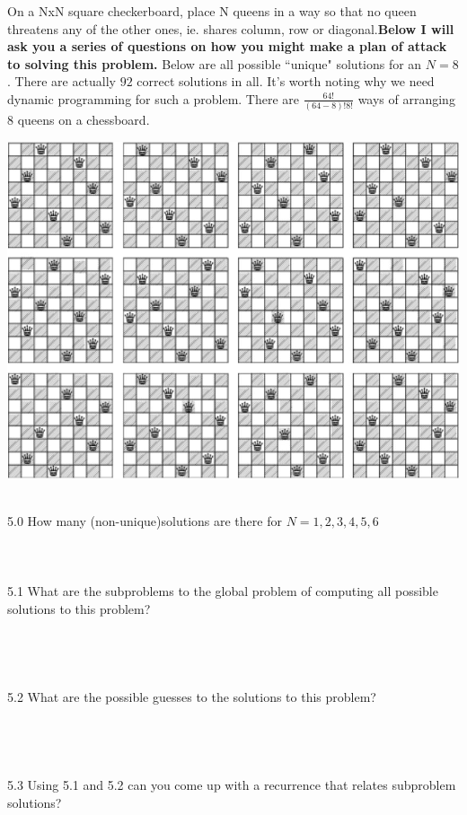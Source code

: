 \documentclass[12pt]{article}
\begin{document}
On a NxN square checkerboard, place N queens in a way so that no queen threatens any 
of the other ones, ie. shares column, row or diagonal.\textbf{Below I will ask you a series of questions 
on how you might make a plan of attack to solving this problem.} Below are all possible ``unique" solutions
for an $N=8$. There are actually $92$ correct solutions in all. It's worth noting why we need dynamic
programming for such a problem. There are $\frac{64!}{(64-8)!8!}$ ways of arranging $8$ queens on a
chessboard.
\centerline{\includegraphics[scale = .25]{queen.jpg}}\\
5.0 How many (non-unique)solutions are there for $N = 1,2,3,4,5,6$\\\\\\\\
5.1 What are the subproblems to the global problem of computing all possible solutions to this problem?\\\\\\\\\\
5.2 What are the possible guesses to the solutions to this problem?\\\\\\\\\\
5.3 Using 5.1 and 5.2 can you come up with a recurrence that relates subproblem solutions?\\\\\\\\
\end{document}
